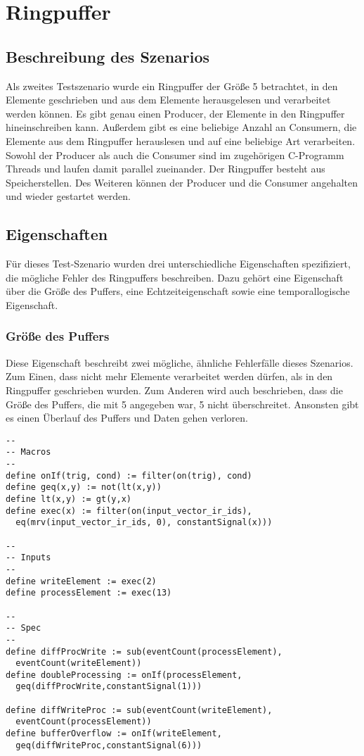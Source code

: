 \documentclass{article}
\begin{document}
\section{Ringpuffer}

\subsection{Beschreibung des Szenarios}

Als zweites Testszenario wurde ein Ringpuffer der Größe 5 betrachtet, in den Elemente geschrieben und aus dem Elemente herausgelesen und verarbeitet werden können. Es gibt genau einen Producer, der Elemente in den Ringpuffer hineinschreiben kann. Außerdem gibt es eine beliebige Anzahl an Consumern, die Elemente aus dem Ringpuffer herauslesen und auf eine beliebige Art verarbeiten. Sowohl der Producer als auch die Consumer sind im zugehörigen C-Programm Threads und laufen damit parallel zueinander. Der Ringpuffer besteht aus Speicherstellen. Des Weiteren können der Producer und die Consumer angehalten und wieder gestartet werden.

\subsection{Eigenschaften}

Für dieses Test-Szenario wurden drei unterschiedliche Eigenschaften spezifiziert, die mögliche Fehler des Ringpuffers beschreiben. Dazu gehört eine Eigenschaft über die Größe des Puffers, eine Echtzeiteigenschaft sowie eine temporallogische Eigenschaft.

\subsubsection{Größe des Puffers}

Diese Eigenschaft beschreibt zwei mögliche, ähnliche Fehlerfälle dieses Szenarios. Zum Einen,
dass nicht mehr Elemente verarbeitet werden dürfen, als in den Ringpuffer geschrieben wurden. 
Zum Anderen wird auch beschrieben, dass die Größe des Puffers, die mit 5 angegeben war, 5 nicht überschreitet. Ansonsten gibt es einen Überlauf des Puffers und Daten gehen verloren.

\begin{lstlisting}[language=tessla+salt]
--
-- Macros
--
define onIf(trig, cond) := filter(on(trig), cond)
define geq(x,y) := not(lt(x,y))
define lt(x,y) := gt(y,x)
define exec(x) := filter(on(input_vector_ir_ids), 
  eq(mrv(input_vector_ir_ids, 0), constantSignal(x)))

--
-- Inputs
--
define writeElement := exec(2)
define processElement := exec(13)

--
-- Spec
--
define diffProcWrite := sub(eventCount(processElement), 
  eventCount(writeElement))
define doubleProcessing := onIf(processElement, 
  geq(diffProcWrite,constantSignal(1)))

define diffWriteProc := sub(eventCount(writeElement), 
  eventCount(processElement))
define bufferOverflow := onIf(writeElement, 
  geq(diffWriteProc,constantSignal(6)))
\end{lstlisting}
\end{document}
